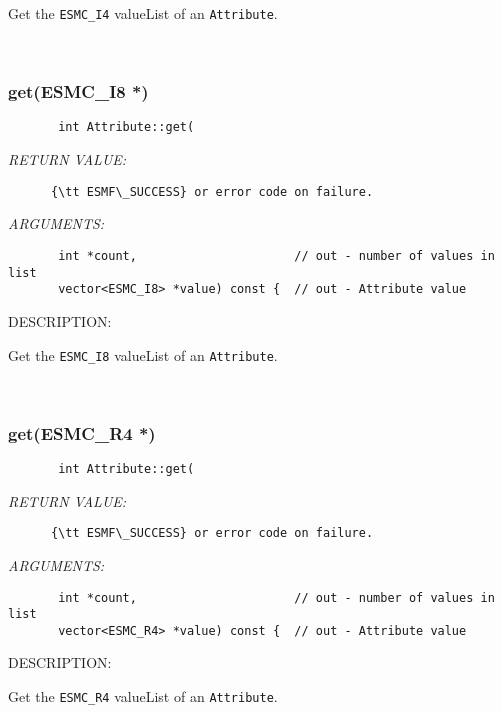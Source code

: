       Get the {\tt ESMC\_I4} valueList of an {\tt Attribute}.
   
 
\mbox{}\hrulefill\
 
\subsubsection [get(ESMC\_I8] {get(ESMC\_I8 *)}


  
\begin{verbatim}       int Attribute::get(
   \end{verbatim}{\em RETURN VALUE:}
\begin{verbatim}      {\tt ESMF\_SUCCESS} or error code on failure.
   \end{verbatim}{\em ARGUMENTS:}
\begin{verbatim}       int *count,                      // out - number of values in list
       vector<ESMC_I8> *value) const {  // out - Attribute value
   \end{verbatim}
{\sf DESCRIPTION:\\ }


      Get the {\tt ESMC\_I8} valueList of an {\tt Attribute}.
   
 
\mbox{}\hrulefill\
 
\subsubsection [get(ESMC\_R4] {get(ESMC\_R4 *)}


  
\begin{verbatim}       int Attribute::get(
   \end{verbatim}{\em RETURN VALUE:}
\begin{verbatim}      {\tt ESMF\_SUCCESS} or error code on failure.
   \end{verbatim}{\em ARGUMENTS:}
\begin{verbatim}       int *count,                      // out - number of values in list
       vector<ESMC_R4> *value) const {  // out - Attribute value
   \end{verbatim}
{\sf DESCRIPTION:\\ }


      Get the {\tt ESMC\_R4} valueList of an {\tt Attribute}.
   
